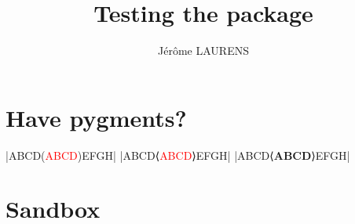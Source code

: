\documentclass[10pt,a4paper]{article}
\begin{document}
\title{Testing the  package}
\author{Jérôme LAURENS}
\maketitle

\section{Have \textsf{pygments}?}
\CDRTest
{}
\CDRTest
\CDRCode[escapeinside=()]|ABCD(\textcolor{red}{ABCD})EFGH|
\CDRCode[escapeinside=⟨⟩]|ABCD⟨\textcolor{red}{ABCD}⟩EFGH|
\CDRCode[tags=src]|ABCD⟨\textbf{ABCD}⟩EFGH|

\section{Sandbox}
\makeatletter\ExplSyntaxOn
\def\CDR@Debug { \use_none:n }
\ExplSyntaxOff\makeatother

%
%
%
%
\end{document}
